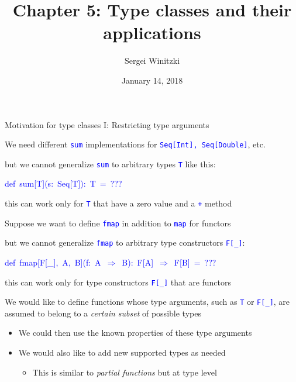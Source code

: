 \documentclass[english]{beamer}
\title[Chapter 5: Type classes]{Chapter 5: Type classes
 and their applications}
\author{Sergei Winitzki}
\date{January 14, 2018}
\institute[ABTB]{Academy by the Bay}
\newenvironment{lyxcode}
   {\par\begin{list}{}{
     \setlength{\rightmargin}{\leftmargin}
     \setlength{\listparindent}{0pt}%
     \raggedright
     \setlength{\itemsep}{0pt}
     \setlength{\parsep}{0pt}
     \normalfont\ttfamily}%
    \def\{{\char`\{}
    \def\}{\char`\}}
    \def\textasciitilde{\char`\~}
    \item[]}
   {\end{list}}
\begin{document}
\frame{\titlepage}
\begin{frame}{Motivation for type classes I: Restricting type arguments}

We need different \texttt{\textcolor{blue}{\footnotesize{}sum}} implementations
for \texttt{\textcolor{blue}{\footnotesize{}Seq{[}Int{]}, Seq{[}Double{]}}},
etc.
\begin{itemize}
\item but we cannot generalize \texttt{\textcolor{blue}{\footnotesize{}sum}}
to arbitrary types \texttt{\textcolor{blue}{\footnotesize{}T}} like
this:
\begin{lyxcode}
\textcolor{blue}{\footnotesize{}def~sum{[}T{]}(s:~Seq{[}T{]}):~T~=~???}{\footnotesize \par}
\end{lyxcode}
\item this can work only for \texttt{\textcolor{blue}{\footnotesize{}T}}
that have a zero value and a \texttt{\textcolor{blue}{\footnotesize{}+}}
method
\end{itemize}
Suppose we want to define \texttt{\textcolor{blue}{\footnotesize{}fmap}}
in addition to \texttt{\textcolor{blue}{\footnotesize{}map}} for functors
\begin{itemize}
\item but we cannot generalize \texttt{\textcolor{blue}{\footnotesize{}fmap}}
to arbitrary type constructors \texttt{\textcolor{blue}{\footnotesize{}F{[}\_{]}}}:
\begin{lyxcode}
\textcolor{blue}{\footnotesize{}def~fmap{[}F{[}\_{]},~A,~B{]}(f:~A~$\Rightarrow$~B):~F{[}A{]}~$\Rightarrow$~F{[}B{]}~=~???}{\footnotesize \par}
\end{lyxcode}
\item this can work only for type constructors \texttt{\textcolor{blue}{\footnotesize{}F{[}\_{]}}}
that are functors
\end{itemize}
We would like to define functions whose type arguments, such as \texttt{\textcolor{blue}{\footnotesize{}T}}
or \texttt{\textcolor{blue}{\footnotesize{}F{[}\_{]}}}, are assumed
to belong to a \emph{certain subset} of possible types
\begin{itemize}
\item We could then use the known properties of these type arguments
\item We would also like to add new supported types as needed
\begin{itemize}
\item This is similar to \emph{partial functions} \textendash{} but at type
level
\end{itemize}
\end{itemize}
\end{frame}
\end{document}
